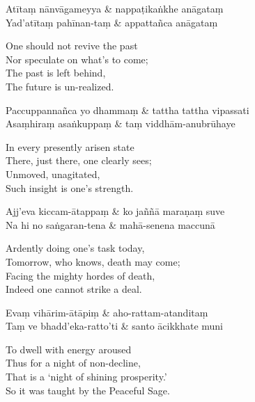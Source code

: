 \begin{twochants}
  Atītaṃ nānvāgameyya & nappaṭikaṅkhe anāgataṃ \\
  Yad'atītaṃ pahīnan-taṃ & appattañca anāgataṃ \\
\end{twochants}

\begin{english}
  One should not revive the past\\
  Nor speculate on what's to come;\\
  The past is left behind,\\
  The future is un-realized.
\end{english}

\begin{twochants}
  Paccuppannañca yo dhammaṃ & tattha tattha vipassati \\
  Asaṃhiraṃ asaṅkuppaṃ & taṃ viddhām-anubrūhaye \\
\end{twochants}

\begin{english}
  In every presently arisen state\\
  There, just there, one clearly sees;\\
  Unmoved, unagitated,\\
  Such insight is one's strength.
\end{english}

\begin{twochants}
  Ajj'eva kiccam-ātappaṃ & ko jaññā maraṇaṃ suve \\
  Na hi no saṅgaran-tena & mahā-senena maccunā \\
\end{twochants}

\begin{english}
  Ardently doing one's task today,\\
  Tomorrow, who knows, death may come;\\
  Facing the mighty hordes of death,\\
  Indeed one cannot strike a deal.
\end{english}

\begin{twochants}
  Evaṃ vihārim-ātāpiṃ & aho-rattam-atanditaṃ \\
  Taṃ ve bhadd'eka-ratto'ti & santo ācikkhate muni \\
\end{twochants}

\begin{english}
  To dwell with energy aroused\\
  Thus for a night of non-decline,\\
  That is a `night of shining prosperity.'\\
  So it was taught by the Peaceful Sage.
\end{english}

